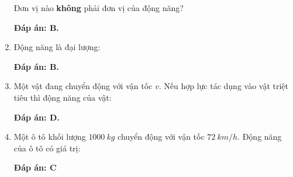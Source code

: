 \begin{enumerate}[label=\bfseries Câu \arabic*:]
	
	{
		Đơn vị nào \textbf{không} phải đơn vị của động năng?
	}
	
	\hideall
	{	
		\textbf{Đáp án: B.}
		
	}
	
	\item {}
	
	
	{Động năng là đại lượng:
	}
	
	\hideall
	{	
		\textbf{Đáp án: B.}
	}
	\item {}
	
	
	{Một vật đang chuyển động với vận tốc $v$. Nếu hợp lực tác dụng vào vật triệt tiêu thì động năng của vật:
	}
	
	\hideall
	{	
		\textbf{Đáp án: D.}
	}
		\item {}
	
	
	{Một ô tô khối lượng $\SI{1000}{kg}$ chuyển động với vận tốc $\SI{72}{km/h}$. Động năng của ô tô có giá trị:
	}
	
	\hideall
	{	
		\textbf{Đáp án: C}
		
}
\end{enumerate}
